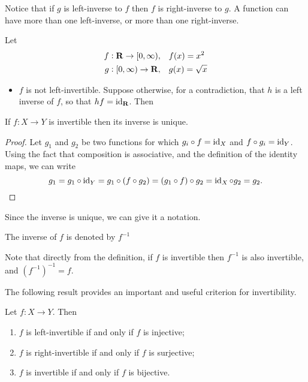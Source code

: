 \begin{remark}
Notice that if $g$ is left-inverse to $f$ then $f$ is right-inverse to $g$. A function can have more than one left-inverse, or more than one right-inverse.
\end{remark}

\begin{example}
Let
\begin{align*}
f:\mathbf R\to[0,\infty),&\quad f(x)=x^2\\
g:[0,\infty)\to\mathbf R,&\quad g(x)=\sqrt{x}
\end{align*}
\begin{itemize}
\item $f$ is not left-invertible. Suppose otherwise, for a contradiction, that $h$ is a left inverse of $f$, so that $hf=\operatorname{id}_\mathbf R$. Then 
\end{itemize}
\end{example}

\begin{proposition}
If $f:X\to Y$ is invertible then its inverse is unique.
\end{proposition}

\begin{proof}
Let $g_1$ and $g_2$ be two functions for which $g_i \circ f = \operatorname{id}_X$ and $f \circ g_i = \operatorname{id}_Y$. Using the fact that composition is associative, and the definition of the identity maps, we can write
\[ g_1 = g_1 \circ \operatorname{id}_Y = g_1 \circ (f \circ g_2) = (g_1 \circ f) \circ g_2 = \operatorname{id}_X \circ g_2 = g_2.\]
\end{proof}

Since the inverse is unique, we can give it a notation.

\begin{notation}
The inverse of $f$ is denoted by $f^{-1}$
\end{notation}

\begin{remark}
Note that directly from the definition, if $f$ is invertible then $f^{-1}$ is also invertible, and $(f^{-1})^{-1}=f$.
\end{remark}

The following result provides an important and useful criterion for invertibility.

\begin{lemma}
Let $f:X\to Y$. Then
\begin{enumerate}[label=(\roman*)]
\item $f$ is left-invertible if and only if $f$ is injective;
\item $f$ is right-invertible if and only if $f$ is surjective;
\item $f$ is invertible if and only if $f$ is bijective.
\end{enumerate}
\end{lemma}

